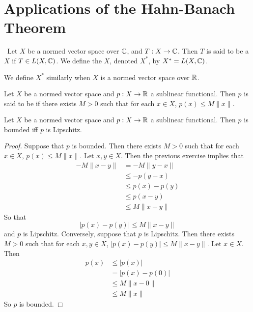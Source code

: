 \documentclass{book}
\begin{document}
	
	
	
	
	
	
	

	

	\newpage
	\section{Applications of the Hahn-Banach Theorem}
	
	
	
	
	
	
	\begin{defn} \
	Let $X$ be a normed vector space over $\mathbb{C}$, and $T :X \rightarrow \mathbb{C}$. Then $T$ is said to be a  $X$ if $T \in L(X, \mathbb{C})$. We define the  $X$, denoted $X^*$, by $X^* = L(X, \mathbb{C})$.
	\end{defn}
	
	\begin{note}
	We define $X^*$ similarly when $X$ is a normed vector space over $\mathbb{R}$.
	\end{note}

	\begin{defn} 
		Let $X$ be a normed vector space and $p:X \rightarrow \mathbb{R}$ a sublinear functional. Then $p$ is said to be  if there exists $M >0$ such that for each $x \in X$, $p(x) \leq M\|x\|$. 
	\end{defn}
	
	\begin{ex} 
		Let $X$ be a normed vector space and $p:X \rightarrow \mathbb{R}$ a sublinear functional. Then $p$ is bounded iff $p$ is Lipschitz. 
	\end{ex}
	
	\begin{proof}
		Suppose that $p$ is bounded. Then there exists $M >0$ such that for each $x \in X$, $p(x) \leq M\|x\|$. Let $x, y \in X$. Then the previous exercise implies that 
		\begin{align*}
			-M\|x-y\| 
			&= -M\|y-x\| \\
			& \leq -p(y-x) \\
			& \leq p(x)-p(y) \\
			& \leq p(x-y) \\
			& \leq M \| x-y\| 
		\end{align*}
		So that $$|p(x) - p(y)| \leq  M\|x-y\|$$
		and $p$ is Lipschitz.
		Conversely, suppose that $p$ is Lipschitz. Then there exists $M >0 $ such that for each $x ,y \in X$, $|p(x) - p(y)| \leq  M\|x-y\|$. Let $x \in X$. Then 
		\begin{align*}
			p(x) 
			& \leq |p(x)| \\
			& = |p(x) - p(0)| \\
			& \leq M\|x - 0\| \\
			& \leq M\|x\| 
		\end{align*}
		So $p$ is bounded.
	\end{proof}
	
\end{document}
